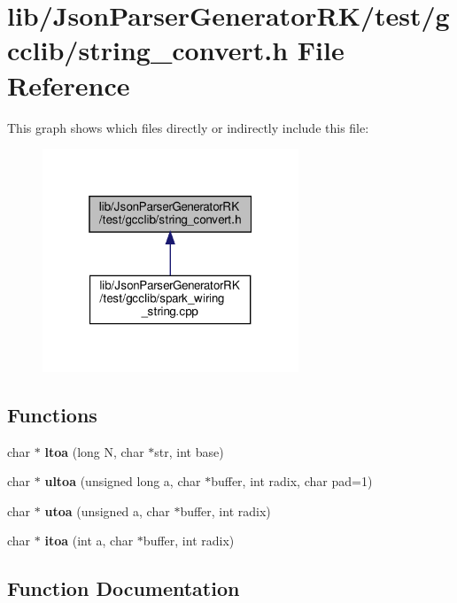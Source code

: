 \section{lib/\+Json\+Parser\+Generator\+R\+K/test/gcclib/string\+\_\+convert.h File Reference}
\label{string__convert_8h}
This graph shows which files directly or indirectly include this file\+:\nopagebreak
\begin{figure}[H]
\begin{center}
\leavevmode
\includegraphics[width=217pt]{string__convert_8h__dep__incl}
\end{center}
\end{figure}
\subsection*{Functions}
\begin{DoxyCompactItemize}
\item 
char $\ast$ \textbf{ ltoa} (long N, char $\ast$str, int base)
\item 
char $\ast$ \textbf{ ultoa} (unsigned long a, char $\ast$buffer, int radix, char pad=1)
\item 
char $\ast$ \textbf{ utoa} (unsigned a, char $\ast$buffer, int radix)
\item 
char $\ast$ \textbf{ itoa} (int a, char $\ast$buffer, int radix)
\end{DoxyCompactItemize}


\subsection{Function Documentation}
\mbox{\label{string__convert_8h_ad3218503767e4c54f14bfab8de4c1303}} 
